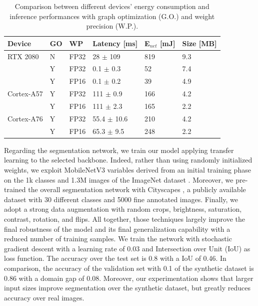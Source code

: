 \documentclass[journal]{IEEEtran}
\begin{document}
\begin{table}[!h]
\caption{Comparison between different devices' energy consumption and inference performances with graph optimization (G.O.) and weight precision (W.P.).}
\centering
\begin{tabular}{llllll}
\toprule
Device     & GO & WP   & Latency {[}ms{]} & E$_{net}$ {[}mJ{]} & Size {[}MB{]} \\ \hline
RTX 2080   & N  & FP32 & 28 $\pm$ 109        & 819             & 9.3          \\ 
           & Y  & FP32 & 0.1 $\pm$ 0.3    & 52              & 7.4          \\ 
           & Y  & FP16 & 0.1 $\pm$ 0.2      & 39              & 4.9           \\ 
Cortex-A57 & Y  & FP32 & 111 $\pm$ 0.9       & 166             & 4.2           \\
           & Y  & FP16 & 111 $\pm$ 2.3       & 165             & 2.2           \\ 
Cortex-A76 & Y  & FP32 & 55.4 $\pm$ 10.6     & 210             & 4.2           \\ 
           & Y  & FP16 & 65.3 $\pm$ 9.5      & 248             & 2.2           \\ \bottomrule
\end{tabular}
\label{tab:devices_comparison}
\end{table}
\vspace{-7pt}

Regarding the segmentation network, we train our model applying transfer learning to the selected backbone. Indeed, rather than using randomly initialized weights, we exploit MobileNetV3 variables derived from an initial training phase on the 1k classes and 1.3M
images of the ImageNet dataset \cite{deng2009imagenet}. Moreover, we pre-trained the overall segmentation network with Cityscapes \cite{cordts2016cityscapes}, a publicly available dataset with 30 different classes and 5000 fine annotated images. Finally, we adopt a strong data augmentation with random crops, brightness, saturation, contrast, rotation, and flips. All together, those techniques largely improve the final robustness of the model and its final generalization capability with a reduced number of training samples.
We train the network with stochastic gradient descent with a learning rate of 0.03 and Intersection over Unit (IoU) as loss function. The accuracy over the test set is 0.8 with a IoU of 0.46. In comparison, the accuracy of the validation set with 0.1 of the synthetic dataset is 0.86 with a domain gap of 0.08. Moreover, our experimentation shows that larger input sizes improve segmentation over the synthetic dataset, but greatly reduces accuracy over real images.
\end{document}
